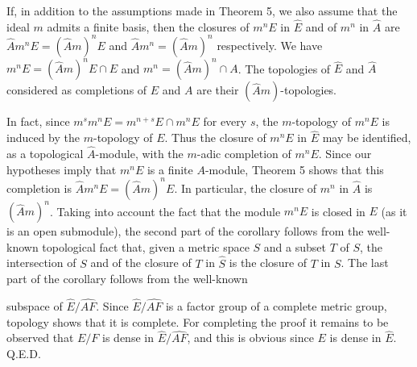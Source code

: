 If, in addition to the assumptions made in Theorem 5, we also assume that the ideal $m$ admits a finite basis, then the closures of $m^n E$ in $\hat{E}$ and of $m^n$ in $\hat{A}$ are $\hat{A} m^n E = (\hat{A} m)^n E$ and $\hat{A} m^n = (\hat{A} m)^n$ respectively. We have $m^n E = (\hat{A} m)^n E \cap E$ and $m^n = (\hat{A} m)^n \cap A$. The topologies of $\hat{E}$ and $\hat{A}$ considered as completions of $E$ and $A$ are their $(\hat{A} m)$-topologies.

In fact, since $m^s m^n E = m^{n+s} E \cap m^n E$ for every $s$, the $m$-topology of $m^n E$ is induced by the $m$-topology of $E$. Thus the closure of $m^n E$ in $\hat{E}$ may be identified, as a topological $\hat{A}$-module, with the $m$-adic completion of $m^n E$. Since our hypotheses imply that $m^n E$ is a finite $A$-module, Theorem 5 shows that this completion is $\hat{A} m^n E = (\hat{A} m)^n E$. In particular, the closure of $m^n$ in $\hat{A}$ is $(\hat{A} m)^n$. Taking into account the fact that the module $m^n E$ is closed in $E$ (as it is an open submodule), the second part of the corollary follows from the well-known topological fact that, given a metric space $S$ and a subset $T$ of $S$, the intersection of $S$ and of the closure of $T$ in $\hat{S}$ is the closure of $T$ in $S$. The last part of the corollary follows from the well-known

subspace of $\hat{E}/\hat{AF}$. Since $\hat{E}/\hat{AF}$ is a factor group of a complete metric group, topology shows that it is complete. For completing the proof it remains to be observed that $E/F$ is dense in $\hat{E}/\hat{AF}$, and this is obvious since $E$ is dense in $\hat{E}$. Q.E.D.